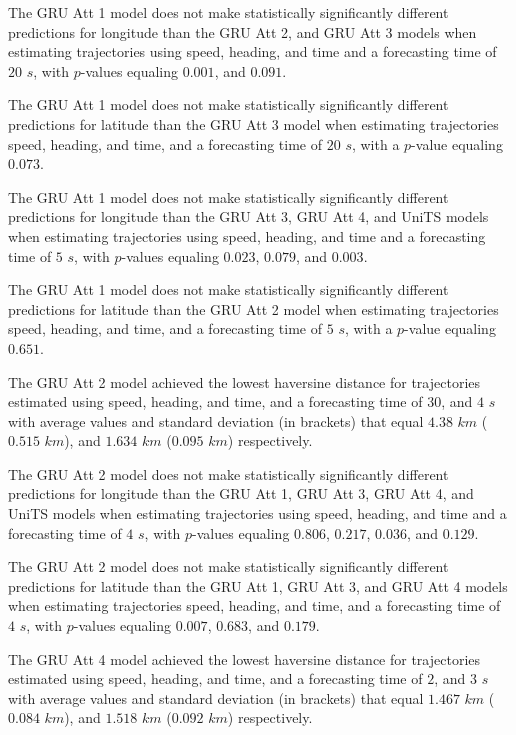 The GRU Att 1 model does not make statistically significantly different predictions for longitude than the GRU Att 2, and GRU Att 3 models when estimating trajectories using speed, heading, and time and a forecasting time of $20$ $s$, with $p$-values equaling $0.001$, and $0.091$.

The GRU Att 1 model does not make statistically significantly different predictions for latitude than the GRU Att 3 model when estimating trajectories speed, heading, and time, and a forecasting time of $20$ $s$, with a $p$-value equaling $0.073$.

The GRU Att 1 model does not make statistically significantly different predictions for longitude than the GRU Att 3, GRU Att 4, and UniTS models when estimating trajectories using speed, heading, and time and a forecasting time of $5$ $s$, with $p$-values equaling $0.023$, $0.079$, and $0.003$.

The GRU Att 1 model does not make statistically significantly different predictions for latitude than the GRU Att 2 model when estimating trajectories speed, heading, and time, and a forecasting time of $5$ $s$, with a $p$-value equaling $0.651$.

The GRU Att 2 model achieved the lowest haversine distance for trajectories estimated using speed, heading, and time, and a forecasting time of $30$, and $4$ $s$ with average values and standard deviation (in brackets) that equal $4.38$ $km$ ($0.515$ $km$), and $1.634$ $km$ ($0.095$ $km$) respectively.

The GRU Att 2 model does not make statistically significantly different predictions for longitude than the GRU Att 1, GRU Att 3, GRU Att 4, and UniTS models when estimating trajectories using speed, heading, and time and a forecasting time of $4$ $s$, with $p$-values equaling $0.806$, $0.217$, $0.036$, and $0.129$.

The GRU Att 2 model does not make statistically significantly different predictions for latitude than the GRU Att 1, GRU Att 3, and GRU Att 4 models when estimating trajectories speed, heading, and time, and a forecasting time of $4$ $s$, with $p$-values equaling $0.007$, $0.683$, and $0.179$.

The GRU Att 4 model achieved the lowest haversine distance for trajectories estimated using speed, heading, and time, and a forecasting time of $2$, and $3$ $s$ with average values and standard deviation (in brackets) that equal $1.467$ $km$ ($0.084$ $km$), and $1.518$ $km$ ($0.092$ $km$) respectively.

